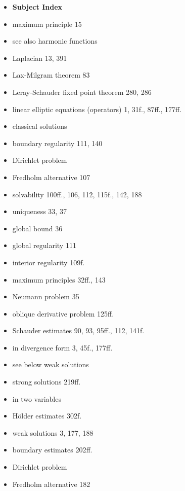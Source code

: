 \begin{itemize}
\item[] \textbf{Subject Index}

\item[] maximum principle \hfill 15
\item[] \quad see also harmonic functions
\item[] Laplacian \hfill 13, 391
\item[] Lax-Milgram theorem \hfill 83
\item[] Leray-Schauder fixed point theorem \hfill 280, 286
\item[] linear elliptic equations (operators) \hfill 1, 31f., 87ff., 177ff.
\item[] \quad classical solutions
\item[] \qquad boundary regularity \hfill 111, 140
\item[] \qquad Dirichlet problem
\item[] \qquad \quad Fredholm alternative \hfill 107
\item[] \qquad \quad solvability \hfill 100ff., 106, 112, 115f., 142, 188
\item[] \qquad \quad uniqueness \hfill 33, 37
\item[] \qquad global bound \hfill 36
\item[] \qquad global regularity \hfill 111
\item[] \qquad interior regularity \hfill 109f.
\item[] \qquad maximum principles \hfill 32ff., 143
\item[] \qquad Neumann problem \hfill 35
\item[] \qquad oblique derivative problem \hfill 125ff.
\item[] \qquad Schauder estimates \hfill 90, 93, 95ff., 112, 141f.
\item[] \quad in divergence form \hfill 3, 45f., 177ff.
\item[] \quad see below weak solutions
\item[] \quad strong solutions \hfill 219ff.
\item[] \quad in two variables
\item[] \qquad Hölder estimates \hfill 302f.
\item[] \quad weak solutions \hfill 3, 177, 188
\item[] \qquad boundary estimates \hfill 202ff.
\item[] \qquad Dirichlet problem
\item[] \qquad \quad Fredholm alternative \hfill 182

\end{itemize}
